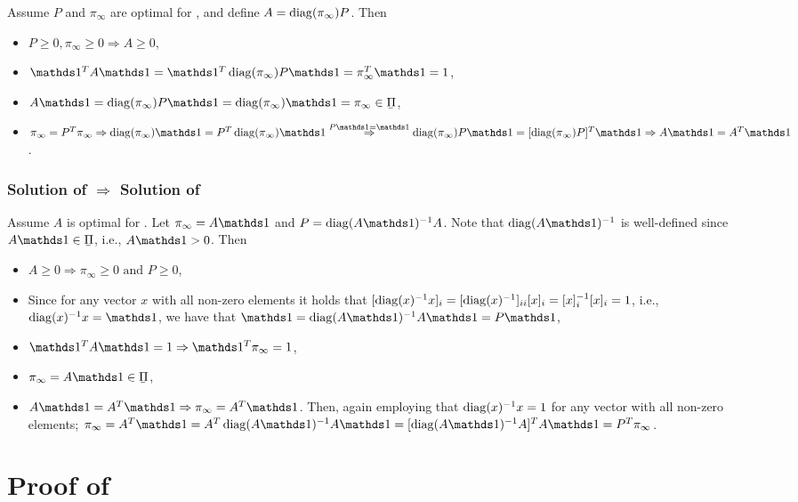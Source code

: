 \documentclass[journal]{IEEEtran}
\newcommand{\polylb}{\underaccent{\bar}{\Pi}}
\newcommand{\pii}{\pi_\infty}
\begin{document}
Assume $P$ and $\pii$ are optimal for , and define $A
= \diag{\pii} P$. Then
\begin{itemize}
    \item $P \geq 0, \pii \geq 0 \Rightarrow A \geq 0$,
    \item $\ones^T A \ones = \ones^T \diag{\pii} P \ones = \pii^T \ones = 1$,
    \item $A\ones = \diag{\pii} P \ones = \diag{\pii} \ones = \pii \in \polylb$,
    \item $\pii = P^T \pii \Rightarrow \diag{\pii} \ones = P^T \diag{\pii} \ones
        \overset{P\ones = \ones}{\Rightarrow} \diag{\pii} P \ones
        = [\diag{\pii}P]^T \ones \Rightarrow A \ones = A^T \ones$.
\end{itemize}

\subsubsection{Solution of  $\Rightarrow$ Solution of
}

Assume $A$ is optimal for . Let $\pii = A \ones$ and $P =
\diag{A\ones}^{-1} A$. Note that $\diag{A \ones}^{-1}$ is well-defined since $A
\ones \in \polylb$, i.e., $A \ones > 0$. Then
\begin{itemize}
    \item $A \geq 0 \Rightarrow \pii \geq 0 \text{ and } P \geq 0$,
    \item Since for any vector $x$ with all non-zero elements it holds that $[\operatorname{diag}(x)^{-1} x]_i
        = [\operatorname{diag}(x)^{-1}]_{ii} [x]_i = [x]_i^{-1} [x]_i = 1$, i.e.,
        $\diag{x}^{-1} x = \ones$, we have that $\ones = \diag{A\ones}^{-1}
        A \ones
        = P \ones$,
    \item $\ones^T A \ones = 1 \Rightarrow \ones^T \pii = 1$,
    \item $\pii = A \ones \in \polylb$,
    \item $A \ones = A^T \ones \Rightarrow \pii = A^T \ones$. Then, again
        employing that $\operatorname{diag}(x)^{-1} x = 1$ for any vector with all non-zero
        elements; $\pii = A^T \ones = A^T \diag{A\ones}^{-1} A \ones
        = [\diag{A\ones}^{-1} A]^T A \ones = P^T \pii$.
\end{itemize}


\section{Proof of }
\end{document}
